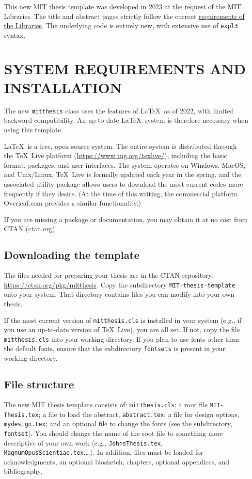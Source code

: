 \documentclass[11pt]{article}
\begin{document}
This new MIT thesis template was developed in 2023 at the request of the MIT Libraries.  The title and abstract pages strictly follow the current \href{https://libraries.mit.edu/distinctive-collections/thesis-specs/}{requirements of the Libraries}. The underlying code is entirely new, with extensive use of  \texttt{expl3} syntax.

\section{SYSTEM REQUIREMENTS AND INSTALLATION}
The new \texttt{mitthesis} class uses the features of \LaTeX\ as of 2022, with limited backward compatibility. An up-to-date \LaTeX\ system is therefore necessary when using this template.  

\LaTeX\ is a free, open source system. The entire system is distributed through the \TeX\ Live platform (\url{https://www.tug.org/texlive/}), including the basic format, packages, and user interfaces.  The system operates on Windows, MacOS, and Unix/Linux. \TeX\ Live is formally updated each year in the spring, and the associated utility package allows users to download the most current codes more frequently if they desire. (At the time of this writing, the commercial platform Overleaf.com provides a similar functionality.)

If you are missing a package or documentation, you may obtain it at no cost from CTAN (\href{http://ctan.org}{ctan.org}). 

\subsection{Downloading the template}
The files needed for preparing your thesis are in the CTAN repository: \url{https://ctan.org/pkg/mitthesis}. Copy the subdirectory \texttt{MIT-thesis-template} onto your system. That directory contains files you can modify into your own thesis. 

If the most current version of \texttt{mitthesis.cls} is installed in your system (e.g., if you use an up-to-date version of \TeX\ Live), you are all set.  If not, copy the file \texttt{mitthesis.cls} into your working directory. If you plan to use fonts other than the default fonts, ensure that the subdirectory \texttt{fontsets} is present in your working directory.

\subsection{File structure}
The new MIT thesis template consists of: \texttt{mitthesis.cls}; a root file \texttt{MIT-Thesis.tex}; a file to load the abstract, \texttt{abstract.tex}; a file for design options, \texttt{mydesign.tex}; and an optional file to change the fonts (see the subdirectory, \texttt{fontset}). You should change the name of the root file to something more descriptive of your own work (e.g., \texttt{JohnsThesis.tex}, \texttt{MagnumOpusScientiae.tex},\ldots). In addition, files must be loaded for acknowledgments, an optional biosketch, chapters, optional appendices, and bibliography.
\end{document}
